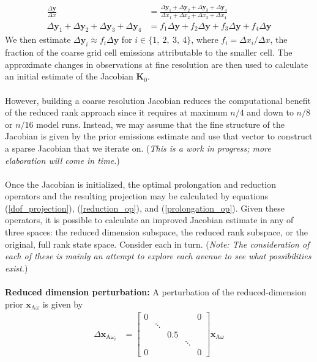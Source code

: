 \documentclass{article}
\newcommand{\y}{\mathbf{y}}
\newcommand{\K}{\mathbf{K}}
\begin{document}
{{\begin{align*}
\frac{\Delta \y}{\Delta x} &= \frac{\Delta  \y_1 + \Delta \y_2 + \Delta \y_3 + \Delta \y_4}{\Delta x_1 + \Delta x_2 + \Delta x_3 + \Delta x_4}\\
\Delta  \y_1 + \Delta \y_2 + \Delta \y_3 + \Delta \y_4 &= f_1\Delta \y + f_2 \Delta \y + f_3 \Delta \y + f_4 \Delta \y
\end{align*}
We then estimate $\Delta \y_i \approx f_i \Delta \y$ for $i \in \{1,\ 2,\ 3,\ 4\}$, where $f_i = \Delta x_i / \Delta x$, the fraction of the coarse grid cell emissions attributable to the smaller cell. The approximate changes in observations at fine resolution are then used to calculate an initial estimate of the Jacobian $\K_0$.\\
\\
However, building a coarse resolution Jacobian reduces the computational benefit of the reduced rank approach since it requires at maximum $n/4$ and down to $n/8$ or $n/16$ model runs. Instead, we may assume that the fine structure of the Jacobian is given by the prior emissions estimate and use that vector to construct a sparse Jacobian that we iterate on. (\textit{This is a work in progress; more elaboration will come in time.})\\
\\
Once the Jacobian is initialized, the optimal prolongation and reduction operators and the resulting projection may be calculated by equations (\ref{dof_projection}), (\ref{reduction_op}), and (\ref{prolongation_op}). Given these operators, it is possible to calculate an improved Jacobian estimate in any of three spaces: the reduced dimension subspace, the reduced rank subspace, or the original, full rank state space. Consider each in turn. (\textit{Note: The consideration of each of these is mainly an attempt to explore each avenue to see what possibilities exist.})\\
\\
\textbf{Reduced dimension perturbation:} A perturbation of the reduced-dimension prior $\mathbf{x}_{\mathrm{A}\omega}$ is given by
\begin{align}
\Delta \mathbf{x}_{\mathrm{A}\omega_i} &= 
\begin{bmatrix}
0 &&&& 0\\
& \ddots &&&\\
&& 0.5 &&\\
&&& \ddots &\\
0 &&&& 0
\end{bmatrix}\mathbf{x}_{\mathrm{A}\omega}\\

\end{align}}}
\end{document}
